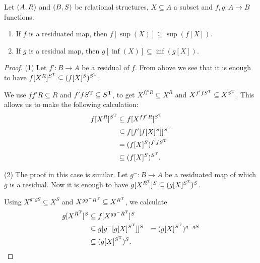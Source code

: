 \begin{proposition} \label{residuationPreservesSupInf}
Let $\left( A, R \right)$ and $\left( B, S \right)$ be relational structures, $X\subseteq A$ a subset and $f,g : A\to B$ functions.
\begin{enumerate}
\item If $f$ is a residuated map, then $f[\sup(X)] \subseteq \sup(f[X])$.
\item If $g$ is a residual map, then $g[\inf(X)] \subseteq \inf(g[X])$.
\end{enumerate}
\end{proposition}
\begin{proof}
(1) Let $f': B\to A$ be a residual of $f$. From above we see that it is enough to have $f[X^R]^{S^{\mathrm{T}}} \subseteq (f[X]^S)^{S^{\mathrm{T}}}$.

We use $ff'R \subseteq R$ and $f'fS^{\mathrm{T}} \subseteq S^{\mathrm{T}}$, to get $X^{ff'R} \subseteq X^{R}$ and $X^{f'fS^{\mathrm{T}}} \subseteq X^{S^{\mathrm{T}}}$. This allows us to make the following calculation:
\begin{align*}
f[X^R]^{S^{\mathrm{T}}} &\subseteq f[X^{ff'R}]^{S^{\mathrm{T}}} \\
&\subseteq f[f'[f[X]^S]]^{S^{\mathrm{T}}} \\
&= (f[X]^S)^{f'fS^{\mathrm{T}}} \\
&\subseteq (f[X]^S)^{S^{\mathrm{T}}}.
\end{align*}

(2) The proof in this case is similar. Let $g^-: B\to A$ be a residuated map of which $g$ is a residual. Now it is enough to have $g[X^{R^{\mathrm{T}}}]^{S} \subseteq (g[X]^{S^{\mathrm{T}}})^{S}$.

Using $X^{g^-gS}\subseteq X^S$ and $X^{gg^-R^{\mathrm{T}}} \subseteq X^{R^{\mathrm{T}}}$, we calculate
\begin{align*}
g[X^{R^{\mathrm{T}}}]^{S} &\subseteq f[X^{gg^-R^{\mathrm{T}}}]^{S} \\
&\subseteq g[g^-[g[X]^{S^{\mathrm{T}}}]]^{S} 
&= (g[X]^{S^{\mathrm{T}}})^{g^-gS} \\
&\subseteq (g[X]^{S^{\mathrm{T}}})^{S}.
\end{align*}
\end{proof}


